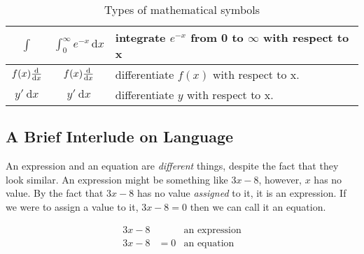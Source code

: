 \begin{table}[!htb]
\begin{tabularx}{\linewidth}{| c || c | X |}
  $ \int    $ & $ \int_0^\infty e^{-x}\,\mathrm{d}x $
                                & integrate $ e^{-x} $ from 0 to $ \infty $
                                with respect to x                     \\ \hline
  $ f(x)\frac{\mathrm{d}}{\mathrm{d}x} $ & $ f(x)\frac{\mathrm{d}}{\mathrm{d}x} $ & differentiate $f(x)$ with respect
                                            to x.                      \\ \hline
  $ y'~\mathrm{d}x $ & $ y'~\mathrm{d}x   $ & differentiate $y$ with respect to
                                            x.                         \\ \hline
\end{tabularx}
\caption{Types of mathematical symbols}
\end{table}
\newpage

\subsection{A Brief Interlude on Language}
\label{sec:ABriefInterludeOnLanguage}
An expression and an equation are \emph{different} things, despite the fact that
they look similar. An expression might be something like $3x - 8$, however, $x$
has no value. By the fact that $3x - 8$ has no value \emph{assigned} to it, it
is an expression. If we were to assign a value to it, $3x-8 = 0$ then we can
call it an equation.

\begin{align}
  3x - 8 & & \text{an expression} \nonumber   \\
  3x - 8 & = 0 & \text{an equation} \nonumber \\
\end{align}

\newpage
